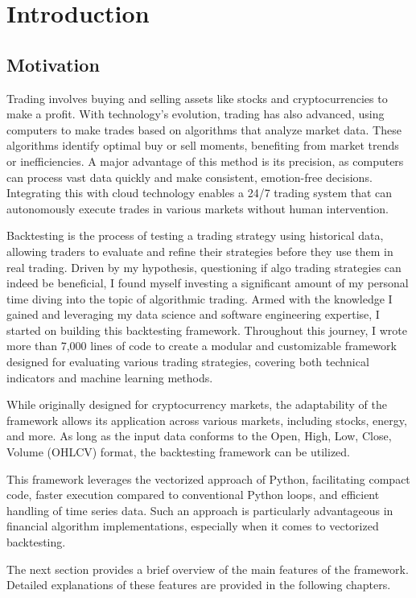 \chapter{Introduction}

\section{Motivation}
Trading involves buying and selling assets like stocks and cryptocurrencies to make a profit. With technology's evolution, trading has also advanced, using computers to make trades based on algorithms that analyze market data. These algorithms identify optimal buy or sell moments, benefiting from market trends or inefficiencies. A major advantage of this method is its precision, as computers can process vast data quickly and make consistent, emotion-free decisions. Integrating this with cloud technology enables a 24/7 trading system that can autonomously execute trades in various markets without human intervention.

Backtesting is the process of testing a trading strategy using historical data, allowing traders to evaluate and refine their strategies before they use them in real trading. Driven by my hypothesis, questioning if algo trading strategies can indeed be beneficial, I found myself investing a significant amount of my personal time diving into the topic of algorithmic trading. Armed with the knowledge I gained and leveraging my data science and software engineering expertise, I started on building this backtesting framework. Throughout this journey, I wrote more than 7,000 lines of code to create a modular and customizable framework designed for evaluating various trading strategies, covering both technical indicators and machine learning methods.

While originally designed for cryptocurrency markets, the adaptability of the framework allows its application across various markets, including stocks, energy, and more.
As long as the input data conforms to the Open, High, Low, Close, Volume (OHLCV) format, the backtesting framework can be utilized.

This framework leverages the vectorized approach of Python, facilitating compact code, faster execution compared to conventional Python loops, and efficient handling of time series data. Such an approach is particularly advantageous in financial algorithm implementations, especially when it comes to vectorized backtesting.

The next section provides a brief overview of the main features of the framework. Detailed explanations of these features are provided in the following chapters.


